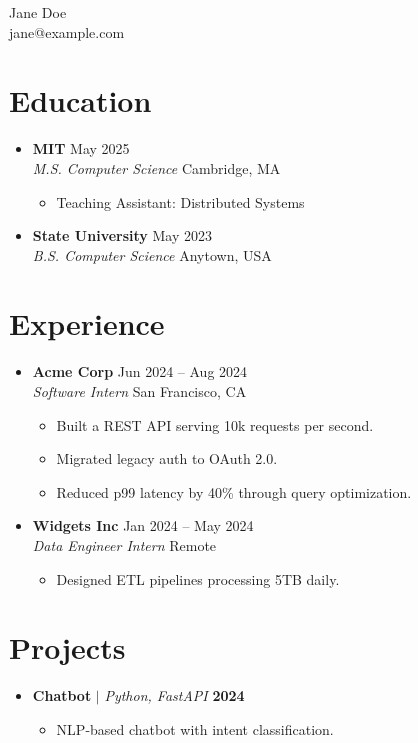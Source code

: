 \documentclass[10pt]{article}
\newcommand{\resumeItem}[1]{\item\small{#1}}
\newcommand{\resumeSubheading}[4]{\item \textbf{#1} #2 \\ \textit{#3} #4}
\newcommand{\resumeProjectHeading}[2]{\item \small#1 \textbf{#2}}
\newcommand{\resumeSubHeadingListStart}{\begin{itemize}}
\newcommand{\resumeSubHeadingListEnd}{\end{itemize}}
\newcommand{\resumeItemListStart}{\begin{itemize}}
\newcommand{\resumeItemListEnd}{\end{itemize}}
\begin{document}
\begin{center}
{\huge Jane Doe} \\
\small jane@example.com
\end{center}

\section{Education}
\resumeSubHeadingListStart
    \resumeSubheading{MIT}{May 2025}{M.S. Computer Science}{Cambridge, MA}
    \resumeItemListStart
        \resumeItem{Teaching Assistant: Distributed Systems}
    \resumeItemListEnd
    \resumeSubheading{State University}{May 2023}{B.S. Computer Science}{Anytown, USA}
\resumeSubHeadingListEnd

\section{Experience}
\resumeSubHeadingListStart
    \resumeSubheading{Acme Corp}{Jun 2024 -- Aug 2024}{Software Intern}{San Francisco, CA}
    \resumeItemListStart
        \resumeItem{Built a REST API serving 10k requests per second.}
        \resumeItem{Migrated legacy auth to OAuth 2.0.}
        \resumeItem{Reduced p99 latency by 40\% through query optimization.}
    \resumeItemListEnd
    \resumeSubheading{Widgets Inc}{Jan 2024 -- May 2024}{Data Engineer Intern}{Remote}
    \resumeItemListStart
        \resumeItem{Designed ETL pipelines processing 5TB daily.}
    \resumeItemListEnd
\resumeSubHeadingListEnd

\section{Projects}
\resumeSubHeadingListStart
    \resumeProjectHeading{\textbf{Chatbot} $|$ \emph{Python, FastAPI}}{2024}
    \resumeItemListStart
        \resumeItem{NLP-based chatbot with intent classification.}
    \resumeItemListEnd
\resumeSubHeadingListEnd
\end{document}
